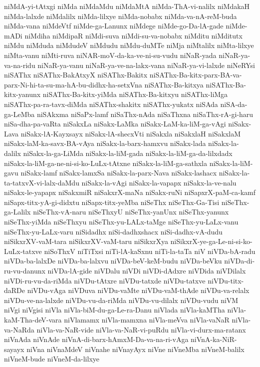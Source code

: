 {niMdA-yi-tAtxgi
niMda
niMdaMdu
niMdaMtA
niMda-ThA-vi-nalilx
niMdakaH
niMda-lalxde
niMdalilx
niMda-lilxye
niMda-nobabx
niMda-va-nA-reM-buda
niMda-vana
niMdeVtf
niMde-ga-Lanunx
niMdege
niMde-go-Da-lA-gade
niMde-mADi
niMdiha
niMdipaR
niMdi-suva
niMdi-su-va-nobabx
niMditu
niMditutx
niMdu
niMduda
niMdudeV
niMdudu
niMdu-duMTe
niMja
niMtalilx
niMta-lilxye
niMta-vanu
niMti-ruva
niNAR-moV-da-ka-ve-ni-su-vudu
niNaR-yada
niNaR-ya-va-na-ridu
niNaR-ya-vanu
niNaR-ya-ve-na-lakx-vana
niNaR-ya-vi-lalxde
niNeRYsi
niSAThx
niSAThx-BakAtxyX
niSAThx-Bakitx
niSAThx-Ba-kitx-parx-BA-va-parx-Ni-hi-ta-su-ma-hA-bu-didhx-ha-setxVna
niSAThx-Ba-kitxya
niSAThx-Ba-kitx-yanunx
niSAThx-Ba-kitx-yiMda
niSAThx-Ba-kitxyu
niSAThx-liMga
niSAThx-pa-ra-tavx-diMda
niSAThx-shakitx
niSAThx-yukatx
niSAda
niSA-da-ga-LeMba
niSAkxma
niSaPx-lamf
niSaThx-nAda
niSaThxna
niSaThx-rA-gi-haru
niSa-dha-pa-vaRta
niSakxLa
niSakx-LaMka
niSakx-LaM-ka-liM-ga-vAgi
niSakx-Lava
niSakx-lA-Kayxsayx
niSakx-lA-shecxVti
niSakxla
niSakxlaH
niSakxlaM
niSakx-laM-ka-savx-BA-vAya
niSakx-la-barx-hamxvu
niSakx-lada
niSakx-la-dalilx
niSakx-la-ga-LiMda
niSakx-la-liM-gada
niSakx-la-liM-ga-da-lilxdadx
niSakx-la-liM-ga-ne-ni-si-ko-LuLx-tAtxne
niSakx-la-liM-ga-sathxla
niSakx-la-liM-gavu
niSakx-lamf
niSakx-lamxSa
niSakx-la-parx-Nava
niSakx-lashacx
niSakx-la-ta-tatxvX-vi-lalx-daMdu
niSakx-la-vAgi
niSakx-la-vapapx
niSakx-la-ve-nalu
niSakx-le-yapapx
niSakxmiR
niSakxrX-maNa
niSakx-ruNi
niSapxrX-paM-ca-kamf
niSapx-titx-yA-gi-didxtu
niSapx-titx-yeMba
niSeThx
niSeThx-Ga-Tisi
niSeThx-ga-Lalilx
niSeThx-vA-naru
niSeThxyU
niSeThx-yanUnx
niSeThx-yanunx
niSeThx-yiMda
niSeThxyu
niSeThx-yu-LALx-taMge
niSeThx-yu-LaLx-vanu
niSeThx-yu-LaLx-varu
niSidadhx
niSi-dadhxshacx
niSi-dadhx-vA-dudu
niSikxrXV-vaM-tara
niSikxrXV-vaM-taru
niSikxrXya
niSikxrX-ye-ga-Le-ni-si-ko-LuLx-tatxve
niSoThxV
niTiTxsi
niTi-lA-kaSxnu
niTi-la-taTa
niV
niVDa-bA-radu
niVDa-ba-lalxDe
niVDa-ba-lalxvu
niVDa-beV-keM-budu
niVDa-beVku
niVDa-di-ru-vu-danunx
niVDa-lA-gide
niVDalu
niVDi
niVDi-dAdxre
niVDida
niVDilalx
niVDi-ru-vu-da-riMda
niVDu-tAtxre
niVDu-tatxde
niVDu-tatxve
niVDu-titx-daRDe
niVDu-vAga
niVDuva
niVDu-vaMte
niVDu-vaM-thAde
niVDu-va-relalx
niVDu-ve-na-lalxde
niVDu-vu-da-riMda
niVDu-vu-dilalx
niVDu-vudu
niVM
niVgi
niVgisi
niVla
niVla-biM-du-ga-Le-ra-Danu
niVlada
niVla-kaMTha
niVla-kaM-Tha-deV-vara
niVlamamx
niVla-mamxna
niVla-meVva
niVla-vaNaR
niVla-va-NaRda
niVla-va-NaR-vide
niVla-va-NaR-vi-puRdu
niVla-vi-durx-ma-ratanx
niVnAda
niVnAde
niVnA-di-barx-hAmxM-Da-va-na-ri-vAga
niVnA-ka-NiR-sayayx
niVna
niVnaMdeV
niVnahe
niVnayAyx
niVne
niVneMba
niVneM-balilx
niVneM-bude
niVneM-da-lilxye
}
